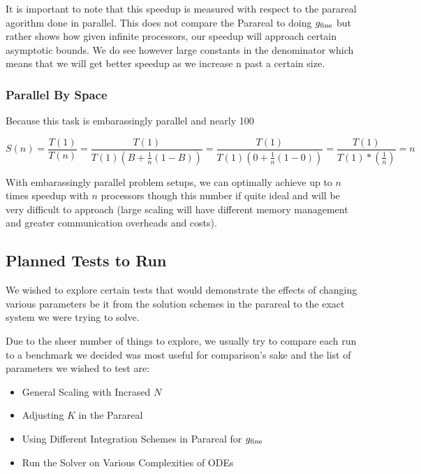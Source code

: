 \documentclass[letterpaper,12pt]{article}
\begin{document}
It is important to note that this speedup is measured with respect to the parareal agorithm done in parallel. This does not compare the Parareal to doing $g_{\textnormal{fine}}$ but rather shows how given infinite processors, our speedup will approach certain asymptotic bounds. We do see however large constants in the denominator which means that we will get better speedup as we increase n past a certain size.

\subsubsection{Parallel By Space}

Because this task is embarassingly parallel and nearly 100%

\[
S(n) = \frac{T(1)}{T(n)} = \frac{T(1)}{ T(1) \left( B + \frac{1}{n} (1-B) \right)} = \frac{T(1)}{T(1) \left( 0 + \frac{1}{n} (1-0) \right)} = \frac{T(1)}{T(1) * \left( \frac{1}{n} \right) } = n
\]

With embarassingly parallel problem setups, we can optimally achieve up to $n$ times speedup with $n$ processors though this number if quite ideal and will be very difficult to approach (large scaling will have different memory management and greater communication overheads and costs).

\subsection{Planned Tests to Run}

We wished to explore certain tests that would demonstrate the effects of changing various parameters be it from the solution schemes in the parareal to the exact system we were trying to solve.

Due to the sheer number of things to explore, we usually try to compare each run to a benchmark we decided was most useful for comparison's sake and the list of parameters we wished to test are:

\begin{itemize}
\item General Scaling with Incrased $N$
\item Adjusting $K$ in the Parareal
\item Using Different Integration Schemes in Parareal for $g_{\textnormal{fine}}$
\item Run the Solver on Various Complexities of ODEs
\end{itemize}
\end{document}
